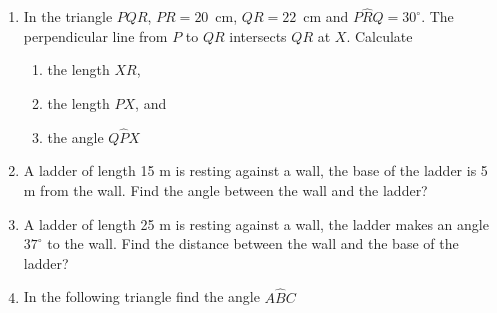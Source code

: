 \begin{enumerate}[noitemsep, label=\textbf{\arabic*}. ]
    \addtocounter{footnote}{-0}
            \label{m39414*uid99}\item In the triangle \begin{math}PQR\end{math}, \begin{math}PR=20\end{math}~cm, \begin{math}QR=22\end{math}~cm and \begin{math}P\hat{R}Q={30}^{\circ }\end{math}. The perpendicular line from \begin{math}P\end{math} to \begin{math}QR\end{math} intersects \begin{math}QR\end{math} at \begin{math}X\end{math}. Calculate
\label{m39414*id92364}\begin{enumerate}[noitemsep, label=\textbf{\alph*}. ] 
            \label{m39414*uid100}\item the length \begin{math}XR\end{math},
\label{m39414*uid101}\item the length \begin{math}PX\end{math}, and
\label{m39414*uid102}\item the angle \begin{math}Q\hat{P}X\end{math}\end{enumerate}
                \label{m39414*uid103}\item A ladder of length 15 m is resting against a wall, the base of the ladder is 5 m from the wall. Find the angle between the wall and the ladder?\newline
            
\label{m39414*uid104}\item A ladder of length 25 m is resting against a wall, the ladder makes an angle \begin{math}{37}^{\circ }\end{math} to the wall. Find the distance between the wall and the base of the ladder?\newline
            
\label{m39414*uid105}\item In the following triangle find the angle \begin{math}A\hat{B}C\end{math}
    \setcounter{subfigure}{0}



\end{enumerate}
